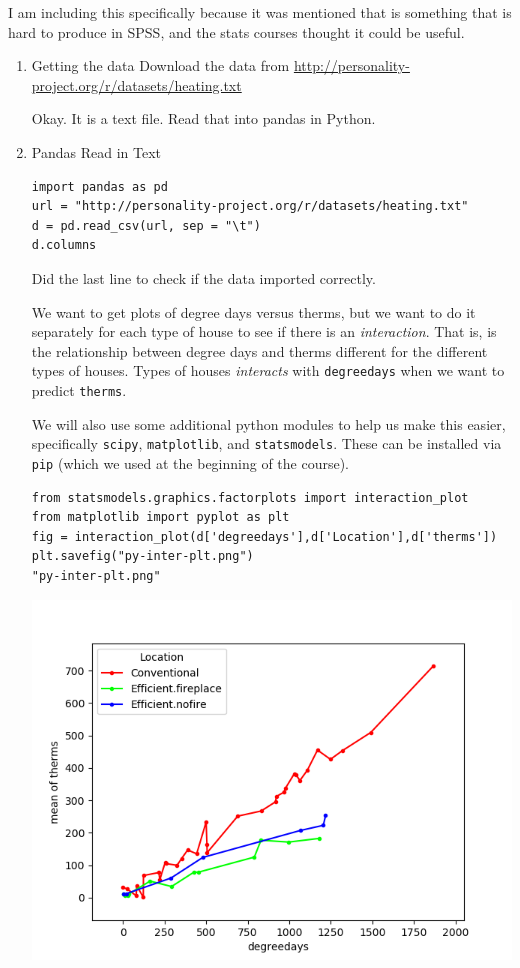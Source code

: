 \documentclass{article}
\begin{document}
I am including this specifically because it was mentioned that is something that is hard to produce in SPSS, and the stats courses thought it could be useful. 
\begin{enumerate}
\item Getting the data
\label{sec:org5a80987}
Download the data from \url{http://personality-project.org/r/datasets/heating.txt}

Okay. It is a text file. Read that into pandas in Python.
\item Pandas Read in Text
\label{sec:org2aa4f83}
\begin{verbatim}
import pandas as pd
url = "http://personality-project.org/r/datasets/heating.txt"
d = pd.read_csv(url, sep = "\t")
d.columns
\end{verbatim}

Did the last line to check if the data imported correctly. 

We want to get plots of degree days versus therms, but we want to do it separately for each type of house to see if there is an \emph{interaction}. That is, is the relationship between degree days and therms different for the different types of houses. Types of houses \emph{interacts} with \texttt{degreedays} when we want to predict \texttt{therms}. 

We will also use some additional python modules to help us make this easier, specifically \texttt{scipy}, \texttt{matplotlib}, and \texttt{statsmodels}. These can be installed via \texttt{pip} (which we used at the beginning of the course). 

\begin{verbatim}
from statsmodels.graphics.factorplots import interaction_plot
from matplotlib import pyplot as plt
fig = interaction_plot(d['degreedays'],d['Location'],d['therms'])
plt.savefig("py-inter-plt.png")
"py-inter-plt.png"
\end{verbatim}

\begin{center}
\includegraphics[width=.9\linewidth]{py-inter-plt.png}
\end{center}


\end{enumerate}
\end{document}
